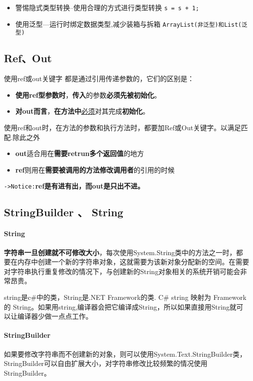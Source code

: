 \documentclass[UTF8,a4paper,12pt]{ctexbook}
\begin{document}
				\begin{itemize}
					\item 警惕隐式类型转换–使用合理的方式进行类型转换 \verb|s = s + 1;|
					\item 使用泛型—运行时绑定数据类型,减少装箱与拆箱 \verb|ArrayList(非泛型)和List(泛型)|
				\end{itemize}
				
		\subsection{Ref、Out}
			使用ref或out关键字 都是通过引用传递参数的，它们的区别是：
			\begin{itemize}
				\item \textbf{使用ref型参数时}，\textbf{传入}的参数\textbf{必须先被初始化}。
				\item \textbf{对out而言}，\textbf{在方法中}\underline{必须}对其完成\textbf{初始化}。
			\end{itemize}
			
			使用ref和out时，在方法的参数和执行方法时，都要加Ref或Out关键字。以满足匹配.除此之外
			\begin{itemize}
				\item \textbf{out}适合用在\textbf{需要retrun多个返回值}的地方
				\item \textbf{ref}则用在\textbf{需要被调用的方法修改调用者}的引用的时候
			\end{itemize}
			
			\verb|->Notice:|\textbf{ref是有进有出，而out是只出不进。}
		
		\subsection{StringBuilder 、 String}
			\paragraph{String}
				\textbf{字符串一旦创建就不可修改大小}，每次使用System.String类中的方法之一时，都要在内存中创建一个新的字符串对象，这就需要为该新对象分配新的空间。在需要对字符串执行重复修改的情况下，与创建新的String对象相关的系统开销可能会非常昂贵。
				
				string是c\#中的类，String是.NET Framework的类. C\# string 映射为 Framework的 String。如果用string,编译器会把它编译成String，所以如果直接用String就可以让编译器少做一点点工作。
				
			\paragraph{StringBuilder}
				如果要修改字符串而不创建新的对象，则可以使用System.Text.StringBuilder类，StringBuilder可以自由扩展大小，对字符串修改比较频繁的情况使用StringBuilder。
				
\end{document}
